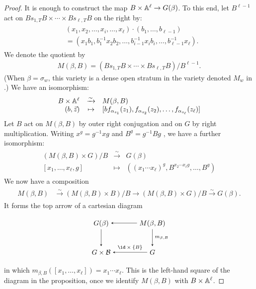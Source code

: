 \documentclass[a4paper,10pt,leqno]{amsart}
\theoremstyle{plain}
\theoremstyle{plain}
\theoremstyle{plain}
\theoremstyle{definition}
\theoremstyle{remark}
\begin{document}
\begin{proof}
It is enough to construct the map $B \times \mathbb{A}^\ell \to G(\beta)$.
To this end, let $B^{\ell - 1}$ act on $Bs_{1, T}B \times \cdots \times Bs_{\ell, T}B$ on the right by:
\begin{align}\begin{split}
&(x_1, x_2, \ldots, x_i, \ldots, x_\ell) \cdot (b_1, \ldots, b_{\ell - 1})\\
&=	(x_1b_1, b_1^{-1}x_2b_2, \ldots, b_{i - 1}^{-1}x_ib_i, \ldots, b_{\ell - 1}^{-1}x_\ell).
\end{split}\end{align}
We denote the quotient by
\begin{align}
M(\beta, B)
=	(Bs_{1, T}B \times \cdots \times Bs_{\ell, T}B)/B^{\ell - 1}.
\end{align}
(When $\beta = \sigma_w$, this variety is a dense open stratum in the variety denoted $M_w$ in \cite{hansen}.)
We have an isomorphism:
\begin{align}
\begin{array}{rcl}
B \times \mathbb{A}^\ell
	&\xrightarrow{\sim}
	&M(\beta, B)\\
(b, \vec{z})
	&\mapsto
	&[bf_{\alpha_{s_1}}(z_1), f_{\alpha_{s_2}}(z_2), \ldots, f_{\alpha_{s_\ell}}(z_\ell)]
	\end{array}
\end{align}
Let $B$ act on $M(\beta, B)$ by outer right conjugation and on $G$ by right multiplication.
Writing $x^g = g^{-1}xg$ and $B^g = g^{-1}Bg$ , we have a further isomorphism:
\begin{align}\label{eq:m}
\begin{array}{rcl}
(M(\beta, B) \times G)/B
	&\xrightarrow{\sim}
	&G(\beta)\\
{[x_1, \ldots, x_\ell, g]}
	&\mapsto
	&((x_1 \cdots x_\ell)^g, B^{x_2 \cdots x_\ell g}, \ldots, B^g)
	\end{array}
\end{align}
We now have a composition
\begin{align}\begin{split}
M(\beta, B)
&\xrightarrow{\sim}
	(M(\beta, B) \times B)/B
\to 
	(M(\beta, B) \times G)/B
\xrightarrow{\sim}
	G(\beta).
\end{split}\end{align}
It forms the top arrow of a cartesian diagram
\begin{equation}
\begin{tikzpicture}[baseline=(current bounding box.center), >=stealth]
\matrix(m)[matrix of math nodes, row sep=2.5em, column sep=3.5em, text height=2ex, text depth=0.5ex]
{	G(\beta)
		&M(\beta, B)\\
	G \times \cal{B}
		&G\\
		};
\path[->,font=\scriptsize, auto]
(m-1-2)		edge (m-1-1)
(m-1-1)		edge (m-2-1)
(m-1-2)		edge node{$m_{\beta, B}$} (m-2-2)
(m-2-2)		edge node[above]{$\id \times \{B\}$} (m-2-1);
\end{tikzpicture}
\end{equation}
in which $m_{\beta, B}([x_1, \ldots, x_\ell]) = x_1\cdots x_\ell$.
This is the left-hand square of the diagram in the proposition, once we identify $M(\beta, B)$ with $B \times \mathbb{A}^\ell$.
\end{proof}
\end{document}

